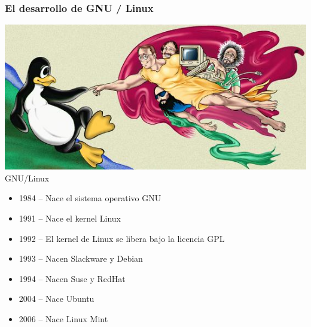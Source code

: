 \documentclass[hyperref={colorlinks}]{beamer}
\begin{document}
\begin{frame}
\frametitle{El desarrollo de GNU / Linux}
\begin{center}
    \includegraphics[width=.50\textwidth]{figs/tux21.png}\\
GNU/Linux
\end{center}
\begin{itemize}
\item 1984 -- Nace el sistema operativo GNU
\item 1991 -- Nace el kernel Linux
\item 1992 -- El kernel de Linux se libera bajo la licencia GPL
\item 1993 -- Nacen Slackware y Debian
\item 1994 -- Nacen Suse y RedHat
\item 2004 -- Nace Ubuntu
\item 2006 -- Nace Linux Mint
\end{itemize}
\end{frame}
\end{document}
